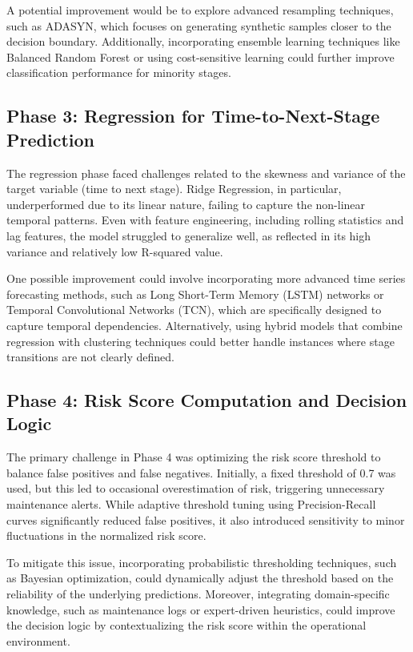 \documentclass[conference]{IEEEtran}
\begin{document}
A potential improvement would be to explore advanced resampling techniques, such as ADASYN, which focuses on generating synthetic samples closer to the decision boundary. Additionally, incorporating ensemble learning techniques like Balanced Random Forest or using cost-sensitive learning could further improve classification performance for minority stages.

\subsection{Phase 3: Regression for Time-to-Next-Stage Prediction}

The regression phase faced challenges related to the skewness and variance of the target variable (time to next stage). Ridge Regression, in particular, underperformed due to its linear nature, failing to capture the non-linear temporal patterns. Even with feature engineering, including rolling statistics and lag features, the model struggled to generalize well, as reflected in its high variance and relatively low R-squared value.

One possible improvement could involve incorporating more advanced time series forecasting methods, such as Long Short-Term Memory (LSTM) networks or Temporal Convolutional Networks (TCN), which are specifically designed to capture temporal dependencies. Alternatively, using hybrid models that combine regression with clustering techniques could better handle instances where stage transitions are not clearly defined.

\subsection{Phase 4: Risk Score Computation and Decision Logic}

The primary challenge in Phase 4 was optimizing the risk score threshold to balance false positives and false negatives. Initially, a fixed threshold of 0.7 was used, but this led to occasional overestimation of risk, triggering unnecessary maintenance alerts. While adaptive threshold tuning using Precision-Recall curves significantly reduced false positives, it also introduced sensitivity to minor fluctuations in the normalized risk score.

To mitigate this issue, incorporating probabilistic thresholding techniques, such as Bayesian optimization, could dynamically adjust the threshold based on the reliability of the underlying predictions. Moreover, integrating domain-specific knowledge, such as maintenance logs or expert-driven heuristics, could improve the decision logic by contextualizing the risk score within the operational environment.
\end{document}
